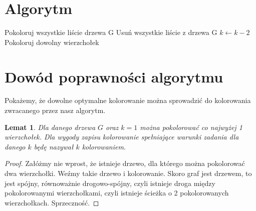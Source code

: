 \documentclass{article}
\newtheorem{lemat}{Lemat}
\begin{document}
\newpage
\section{Algorytm}
\begin{algorithmic}
    \STATE Pokoloruj wszystkie liście drzewa G
    \STATE Usuń wszystkie liście z drzewa G
    \STATE $k \leftarrow k-2$
\ENDWHILE
{}
    \STATE Pokoloruj dowolny wierzchołek
\ENDIF
\end{algorithmic}


\section{Dowód poprawności algorytmu}
Pokażemy, że dowolne optymalne kolorowanie można sprowadzić do kolorowania zwracanego przez nasz algorytm.

\begin{lemat}
Dla danego drzewa $G$ oraz $k=1$ można pokolorować co najwyżej 1 wierzchołek. Dla wygody zapisu kolorowanie spełniające warunki zadania dla danego $k$ będę nazywał $k$ kolorowaniem.
\end{lemat}
\begin{proof}
Załóżmy nie wprost, że istnieje drzewo, dla którego można pokolorować dwa wierzchołki. Weźmy takie drzewo i kolorowanie. Skoro graf jest drzewem, to jest spójny, równoważnie drogowo-spójny, czyli istnieje droga między pokolorowanymi wierzchołkami, czyli istnieje ścieżka o 2 pokolorowanych wierzchołkach. Sprzeczność.
\end{proof}
\end{document}
